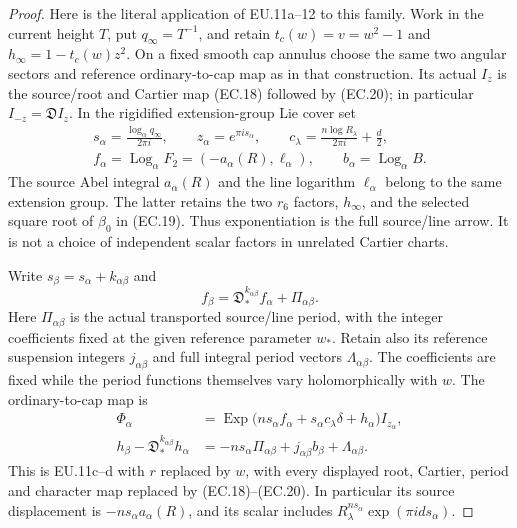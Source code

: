 \begin{proof}
Here is the literal application of EU.11a--12 to this family. Work in
the current height \(T\), put \(q_\infty=T^{-1}\), and retain
\(t_c(w)=v=w^2-1\) and \(h_\infty=1-t_c(w)z^2\). On a fixed
smooth cap annulus choose the same two angular sectors and reference
ordinary-to-cap map as in that construction. Its actual
\(I_z\) is the source/root and Cartier map (EC.18) followed by
(EC.20); in particular \(I_{-z}=\mathfrak D I_z\). In the
rigidified extension-group Lie cover set
\[
 \begin{gathered}
 s_\alpha=\frac{\log_\alpha q_\infty}{2\pi i},\qquad
 z_\alpha=e^{\pi i s_\alpha},\qquad
 c_\lambda=\frac{n\log R_\lambda}{2\pi i}+\frac d2,\\
 f_\alpha=\operatorname{Log}_\alpha F_2
       =(-a_\alpha(R),\ell_\alpha),\qquad
 b_\alpha=\operatorname{Log}_\alpha B .
 \end{gathered}
 \tag{EC.21a}
\]
The source Abel integral \(a_\alpha(R)\) and the line logarithm
\(\ell_\alpha\) belong to the same extension group. The latter
retains the two \(r_6\) factors, \(h_\infty\), and the selected
square root of \(\beta_0\) in (EC.19). Thus exponentiation is
the full source/line arrow. It is not a choice of independent
scalar factors in unrelated Cartier charts.

Write \(s_\beta=s_\alpha+k_{\alpha\beta}\) and
\[
 f_\beta=\mathfrak D_*^{k_{\alpha\beta}}f_\alpha+
                         \Pi_{\alpha\beta}.
\]
Here \(\Pi_{\alpha\beta}\) is the actual transported source/line
period, with the integer coefficients fixed at the given reference
parameter \(w_*\). Retain also its reference suspension integers
\(j_{\alpha\beta}\) and full integral period vectors
\(\Lambda_{\alpha\beta}\). The coefficients are fixed while the
period functions themselves vary holomorphically with \(w\).
The ordinary-to-cap map is
\[
 \begin{split}
 \Phi_\alpha
   &=\operatorname{Exp}\bigl(
       n s_\alpha f_\alpha+s_\alpha c_\lambda\delta+
                         h_\alpha\bigr)I_{z_\alpha},\\
 h_\beta-\mathfrak D_*^{k_{\alpha\beta}}h_\alpha
   &=-n s_\alpha\Pi_{\alpha\beta}
          +j_{\alpha\beta}b_\beta+\Lambda_{\alpha\beta}.
 \end{split}
 \tag{EC.21b}
\]
This is EU.11c--d with \(r\) replaced by \(w\), with every displayed
root, Cartier, period and character map replaced by (EC.18)--(EC.20).
In particular its source displacement is
\(-n s_\alpha a_\alpha(R)\), and its scalar includes
\(R_\lambda^{n s_\alpha}\exp(\pi i d s_\alpha)\).


\end{proof}
